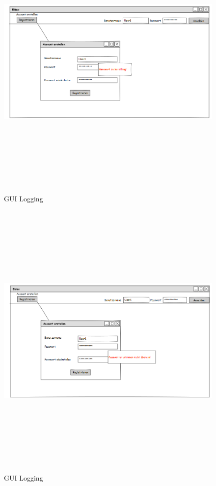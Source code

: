 \begin{center}
	
	\begin{figure}
		\hspace*{-1.9cm}
		\includegraphics[width=170mm, height =140mm]{PencilProjectData/logging3}
		\caption{GUI Logging}
	\end{figure}
	
	\begin{figure}
		\hspace*{-2cm}
		\includegraphics[width=170mm, height =140mm]{PencilProjectData/logging4}
		\caption{GUI Logging}
	\end{figure}
	

\end{center}
